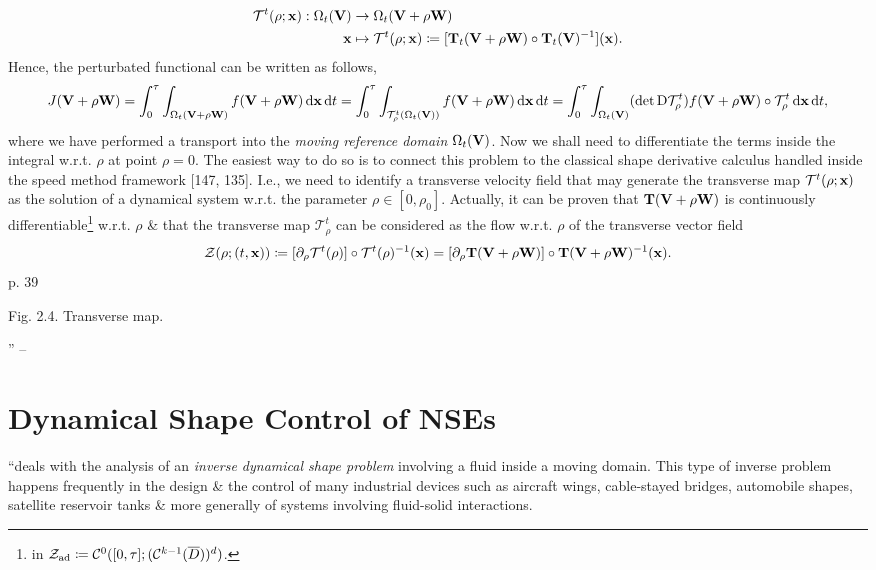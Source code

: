 \documentclass[oneside]{book}
\numberwithin{equation}{section}
\begin{document}
\begin{align*}
	\mathcal{T}^t(\rho;{\bf x}):\Omega_t({\bf V})&\to\Omega_t({\bf V} + \rho{\bf W})\\
	{\bf x}&\mapsto\mathcal{T}^t(\rho;{\bf x})\coloneqq[{\bf T}_t({\bf V} + \rho{\bf W})\circ{\bf T}_t({\bf V})^{-1}]({\bf x}).
\end{align*}
Hence, the perturbated functional can be written as follows,
\begin{align*}
	J({\bf V} + \rho{\bf W}) = \int_0^\tau\int_{\Omega_t({\bf V} + \rho{\bf W})} f({\bf V} + \rho{\bf W})\,{\rm d}{\bf x}\,{\rm d}t = \int_0^\tau\int_{\mathcal{T}_\rho^t(\Omega_t({\bf V}))} f({\bf V} + \rho{\bf W})\,{\rm d}{\bf x}\,{\rm d}t = \int_0^\tau\int_{\Omega_t({\bf V})} (\det{\rm D}\mathcal{T}_\rho^t)f({\bf V} + \rho{\bf W})\circ\mathcal{T}_\rho^t\,{\rm d}{\bf x}\,{\rm d}t,
\end{align*}
where we have performed a transport into the \textit{moving reference domain} $\Omega_t({\bf V})$. Now we shall need to differentiate the terms inside the integral w.r.t. $\rho$ at point $\rho = 0$. The easiest way to do so is to connect this problem to the classical shape derivative calculus handled inside the speed method framework [147, 135]. I.e., we need to identify a transverse velocity field that may generate the transverse map $\mathcal{T}^t(\rho;{\bf x})$ as the solution of a dynamical system w.r.t. the parameter $\rho\in[0,\rho_0]$. Actually, it can be proven that ${\bf T}({\bf V} + \rho{\bf W})$ is continuously differentiable\footnote{in $\mathcal{Z}_{\rm ad}\coloneqq\mathcal{C}^0([0,\tau];(\mathcal{C}^{k-1}(\overline{D}))^d)$.} w.r.t. $\rho$ \& that the transverse map $\mathcal{T}_\rho^t$ can be considered as the flow w.r.t. $\rho$ of the transverse vector field
\begin{align*}
	\mathcal{Z}(\rho;(t,{\bf x}))\coloneqq[\partial_\rho\mathcal{T}^t(\rho)]\circ\mathcal{T}^t(\rho)^{-1}({\bf x}) = [\partial_\rho{\bf T}({\bf V} + \rho{\bf W})]\circ{\bf T}({\bf V} + \rho{\bf W})^{-1}({\bf x}).
\end{align*}
p. 39

\textsf{Fig. 2.4. Transverse map.}

'' -- \cite[Chap. 2, Sect. 2.3, pp. 37--]{Moubachir_Zolesio2006}

\section{Dynamical Shape Control of NSEs}
\cite[Chap. 5]{Moubachir_Zolesio2006} ``deals with the analysis of an \textit{inverse dynamical shape problem} involving a fluid inside a moving domain. This type of inverse problem happens frequently in the design \& the control of many industrial devices such as aircraft wings, cable-stayed bridges, automobile shapes, satellite reservoir tanks \& more generally of systems involving fluid-solid interactions.
\end{document}
